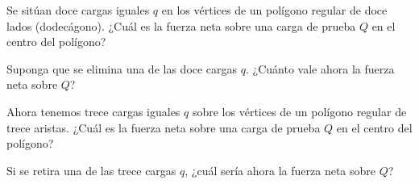 \documentclass[a4paper,10pt]{article}
\begin{document}

% 
\begin{qboxshort}
\begin{subejercicio}
  \item  Se sitúan doce cargas iguales $q$ en los vértices de un polígono
    regular de doce lados (dodecágono).
    ¿Cuál es la fuerza neta sobre una carga de prueba $Q$ en el centro
    del polígono?
  \item Suponga que se elimina una de las doce cargas $q$.
    ¿Cuánto vale ahora la fuerza neta sobre $Q$?
  \item Ahora tenemos trece cargas iguales $q$ sobre los vértices de un
    polígono regular de trece aristas. ¿Cuál es la fuerza neta sobre una
    carga de prueba $Q$ en el centro del polígono?
  \item Si se retira una de las trece cargas $q$, ¿cuál sería ahora la
    fuerza neta sobre $Q$?
\end{subejercicio}
\end{qboxshort}


\end{document}
